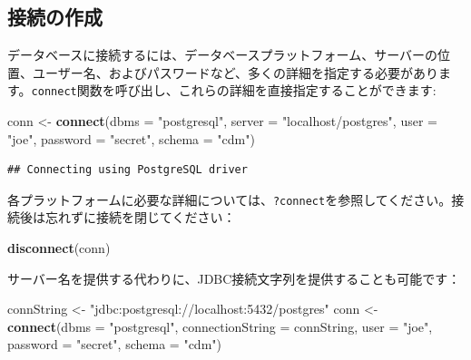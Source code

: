 \documentclass[
  11pt]{book}
\newenvironment{Shaded}{\begin{snugshade}}{\end{snugshade}}
\newcommand{\AttributeTok}[1]{\textcolor[rgb]{0.13,0.29,0.53}{#1}}
\newcommand{\FunctionTok}[1]{\textcolor[rgb]{0.13,0.29,0.53}{\textbf{#1}}}
\newcommand{\NormalTok}[1]{#1}
\newcommand{\OtherTok}[1]{\textcolor[rgb]{0.56,0.35,0.01}{#1}}
\newcommand{\StringTok}[1]{\textcolor[rgb]{0.31,0.60,0.02}{#1}}
\theoremstyle{definition}
\theoremstyle{definition}
\theoremstyle{definition}
\theoremstyle{definition}
\theoremstyle{remark}
\begin{document}
\subsection{接続の作成}\label{ux63a5ux7d9aux306eux4f5cux6210}

データベースに接続するには、データベースプラットフォーム、サーバーの位置、ユーザー名、およびパスワードなど、多くの詳細を指定する必要があります。\texttt{connect}関数を呼び出し、これらの詳細を直接指定することができます: 

\begin{Shaded}
\begin{Highlighting}[]
\NormalTok{conn }\OtherTok{\textless{}{-}} \FunctionTok{connect}\NormalTok{(}\AttributeTok{dbms =} \StringTok{"postgresql"}\NormalTok{,}
                \AttributeTok{server =} \StringTok{"localhost/postgres"}\NormalTok{,}
                \AttributeTok{user =} \StringTok{"joe"}\NormalTok{,}
                \AttributeTok{password =} \StringTok{"secret"}\NormalTok{,}
                \AttributeTok{schema =} \StringTok{"cdm"}\NormalTok{)}
\end{Highlighting}
\end{Shaded}

\begin{verbatim}
## Connecting using PostgreSQL driver
\end{verbatim}

各プラットフォームに必要な詳細については、\texttt{?connect}を参照してください。接続後は忘れずに接続を閉じてください：

\begin{Shaded}
\begin{Highlighting}[]
\FunctionTok{disconnect}\NormalTok{(conn)}
\end{Highlighting}
\end{Shaded}

サーバー名を提供する代わりに、JDBC接続文字列を提供することも可能です：

\begin{Shaded}
\begin{Highlighting}[]
\NormalTok{connString }\OtherTok{\textless{}{-}} \StringTok{"jdbc:postgresql://localhost:5432/postgres"}
\NormalTok{conn }\OtherTok{\textless{}{-}} \FunctionTok{connect}\NormalTok{(}\AttributeTok{dbms =} \StringTok{"postgresql"}\NormalTok{,}
                \AttributeTok{connectionString =}\NormalTok{ connString,}
                \AttributeTok{user =} \StringTok{"joe"}\NormalTok{,}
                \AttributeTok{password =} \StringTok{"secret"}\NormalTok{,}
                \AttributeTok{schema =} \StringTok{"cdm"}\NormalTok{)}
\end{Highlighting}
\end{Shaded}
\end{document}
